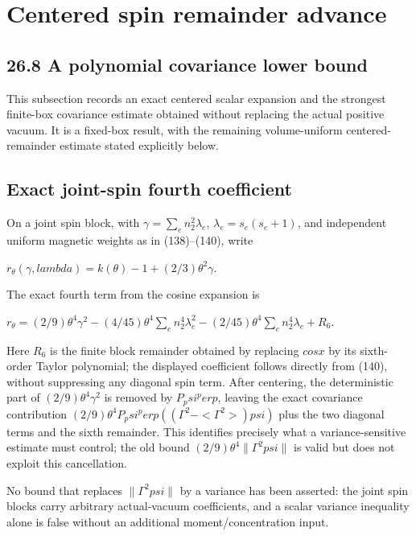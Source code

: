 \documentclass[
  11pt,
]{article}
\begin{document}
\section{Centered spin remainder
advance}\label{centered-spin-remainder-advance}

\subsection{26.8 A polynomial covariance lower
bound}\label{a-polynomial-covariance-lower-bound}

This subsection records an exact centered scalar expansion and the
strongest finite-box covariance estimate obtained without replacing the
actual positive vacuum. It is a fixed-box result, with the remaining
volume-uniform centered-remainder estimate stated explicitly below.

\subsection{Exact joint-spin fourth
coefficient}\label{exact-joint-spin-fourth-coefficient}

On a joint spin block, with \(\gamma=\sum_e n_2^2 \lambda_e\),
\(\lambda_e=s_e(s_e+1)\), and independent uniform magnetic weights as in
(138)--(140), write

\(r_\theta(\gamma,lambda)=k(\theta)-1+(2/3)\theta^2 \gamma\).

The exact fourth term from the cosine expansion is

\(r_\theta = (2/9) \theta^4 \gamma^2 -(4/45)\theta^4 \sum_e n_2^4 \lambda_e^2 -(2/45)\theta^4 \sum_e n_2^4 \lambda_e + R_6\).

Here \(R_6\) is the finite block remainder obtained by replacing
\(cos x\) by its sixth-order Taylor polynomial; the displayed
coefficient follows directly from (140), without suppressing any
diagonal spin term. After centering, the deterministic part of
\((2/9)\theta^4 \gamma^2\) is removed by \(P_psi^perp\), leaving the
exact covariance contribution
\((2/9)\theta^4 P_psi^perp((\Gamma^2-<\Gamma^2>)psi)\) plus the two
diagonal terms and the sixth remainder. This identifies precisely what a
variance-sensitive estimate must control; the old bound
\((2/9)\theta^4\|\Gamma^2 psi\|\) is valid but does not exploit this
cancellation.

No bound that replaces \(\|\Gamma^2 psi\|\) by a variance has been
asserted: the joint spin blocks carry arbitrary actual-vacuum
coefficients, and a scalar variance inequality alone is false without an
additional moment/concentration input.
\end{document}
